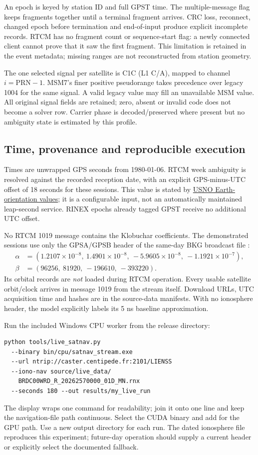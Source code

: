 An epoch is keyed by station ID and full GPST time. The multiple-message flag
keeps fragments together until a terminal fragment arrives. CRC loss, reconnect,
changed epoch before termination and end-of-input produce explicit incomplete
records. RTCM has no fragment count or sequence-start flag: a newly connected
client cannot prove that it saw the first fragment. This limitation is retained
in the event metadata; missing ranges are not reconstructed from station geometry.

The one selected signal per satellite is C1C (L1 C/A), mapped to channel
$i=\mathrm{PRN}-1$. MSM7's finer positive pseudorange takes precedence over
legacy 1004 for the same signal. A valid legacy value may fill an unavailable
MSM value. All original signal fields are retained; zero, absent or invalid code
does not become a solver row. Carrier phase is decoded/preserved where present
but no ambiguity state is estimated by this profile.

\subsection{Time, provenance and reproducible execution}
Times are unwrapped GPS seconds from 1980-01-06. RTCM week ambiguity is resolved
against the recorded reception date, with an explicit GPS-minus-UTC offset of
18 seconds for these sessions. This value is stated by
\href{https://maia.usno.navy.mil/information/eo-values}{USNO Earth-orientation values};
it is a configurable input, not an automatically maintained leap-second service.
RINEX epochs already tagged GPST receive no additional UTC offset.

No RTCM 1019 message contains the Klobuchar coefficients. The demonstrated
sessions use only the GPSA/GPSB header of the same-day BKG broadcast file
:
\begin{align}
\alpha&=(1.2107\!\times\!10^{-8},\ 1.4901\!\times\!10^{-8},\
 -5.9605\!\times\!10^{-8},\ -1.1921\!\times\!10^{-7}),\\
\beta&=(96256,\ 81920,\ -196610,\ -393220).
\end{align}
Its orbital records are \emph{not} loaded during RTCM operation. Every usable
satellite orbit/clock arrives in message 1019 from the stream itself. Download
URLs, UTC acquisition time and hashes are in the source-data manifests. With no
ionosphere header, the model explicitly labels its 5 ns baseline approximation.

Run the included Windows CPU worker from the release directory:
\begin{lstlisting}
python tools/live_satnav.py
  --binary bin/cpu/satnav_stream.exe
  --url ntrip://caster.centipede.fr:2101/LIENSS
  --iono-nav source/live_data/
    BRDC00WRD_R_20262570000_01D_MN.rnx
  --seconds 180 --out results/my_live_run
\end{lstlisting}
The display wraps one command for readability; join it onto one line and keep
the navigation-file path continuous. Select the CUDA binary and add
\code{--backend cuda} for the GPU path. Use a new output directory for each run.
The dated ionosphere file reproduces this experiment; future-day operation
should supply a current header or explicitly select the documented fallback.

